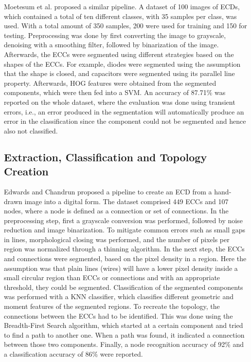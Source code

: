 Moetesum et al. \cite{ecd_seghogsvm} proposed a similar pipeline.
A dataset of 100 images of \acp{ECD}, which contained a total of ten different classes, with 35 samples per class, was used.
With a total amount of 350 samples, 200 were used for training and 150 for testing.
Preprocessing was done by first converting the image to grayscale, denoising with a smoothing filter, followed by binarization of the image.
Afterwards, the \acp{ECC} were segmented using different strategies based on the shapes of the \acp{ECC}.
For example, diodes were segmented using the assumption that the shape is closed, and capacitors were segmented using its parallel line property.
Afterwards, \ac{HOG} features were obtained from the segmented components, which were then fed into a \ac{SVM}.
An accuracy of 87.71\% was reported on the whole dataset, where the evaluation was done using transient errors, i.e., an error produced in the segmentation will automatically produce an error in the classification since the component could not be segmented and hence also not classified.

\subsection{Extraction, Classification and Topology Creation}
\label{sec:rel_extract_classification_topology}

Edwards and Chandrun \cite{ecd_knnfull} proposed a pipeline to create an \ac{ECD} from a hand-drawn image into a digital form.
The dataset comprised 449 \acp{ECC} and 107 nodes, where a node is defined as a connection or set of connections.
In the preprocessing step, first a grayscale conversion was performed, followed by noise reduction and image binarization.
To mitigate common errors such as small gaps in lines, morphological closing was performed, and the number of pixels per region was normalized through a thinning algorithm.
In the next step, the \acp{ECC} and connections were segmented, based on the pixel density in a region.
Here the assumption was that plain lines (wires) will have a lower pixel density inside a small circular region than \acp{ECC} or connections and with an appropriate threshold, they could be segmented.
Classification of the segmented components was performed with a \ac{KNN} classifier, which classifies different geometric and moment features of the segmented regions.
To recreate the topology, the connections between the \acp{ECC} had to be identified.
This was done using the Breadth-First Search algorithm, which started at a certain component and tried to find a path to another one.
When a path was found, it indicated a connection between those two components.
Finally, a node recognition accuracy of 92\% and a classification accuracy of 86\% were reported.

